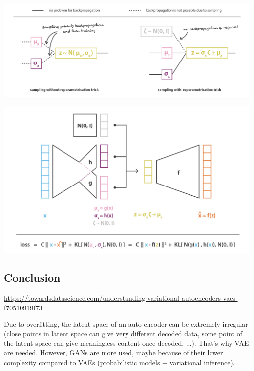 \begin{itemize}
    \includegraphics[scale=0.2]{content/reparametrisation_trick.png}
    
    \includegraphics[scale=0.2]{content/final_vae_architecture.png}

\end{itemize}
\subsection{Conclusion}
\href{https://towardsdatascience.com/understanding-variational-autoencoders-vaes-f70510919f73}{https://towardsdatascience.com/understanding-variational-autoencoders-vaes-f70510919f73}

Due to overfitting, the latent space of an auto-encoder can be extremely irregular (close points in latent space can give very different decoded data, some point of the latent space can give meaningless content once decoded, ...). That's why VAE are needed.
However, GANs are more used, maybe because of their lower complexity compared to VAEs (probabilistic models + variational inference).